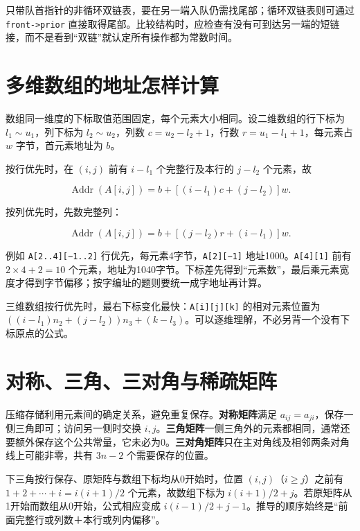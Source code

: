 只带队首指针的非循环双链表，要在另一端入队仍需找尾部；循环双链表则可通过 \texttt{front-\textgreater{}prior} 直接取得尾部。比较结构时，应检查有没有可到达另一端的短链接，而不是看到``双链''就认定所有操作都为常数时间。

\section{多维数组的地址怎样计算}\label{ds-03-05}

数组同一维度的下标取值范围固定，每个元素大小相同。设二维数组的行下标为 \(l_1\sim u_1\)，列下标为 \(l_2\sim u_2\)，列数 \(c=u_2-l_2+1\)，行数 \(r=u_1-l_1+1\)，每元素占 \(w\) 字节，首元素地址为 \(b\)。

按行优先时，在 \((i,j)\) 前有 \(i-l_1\) 个完整行及本行的 \(j-l_2\) 个元素，故

\[\operatorname{Addr}(A[i,j])=b+[(i-l_1)c+(j-l_2)]w.\]

按列优先时，先数完整列：

\[\operatorname{Addr}(A[i,j])=b+[(j-l_2)r+(i-l_1)]w.\]

例如 \texttt{A{[}2..4{]}{[}−1..2{]}} 行优先，每元素4字节，\texttt{A{[}2{]}{[}−1{]}} 地址1000。\texttt{A{[}4{]}{[}1{]}} 前有 \(2\times4+2=10\) 个元素，地址为1040字节。下标差先得到``元素数''，最后乘元素宽度才得到字节偏移；按字编址的题则要统一成字地址再计算。

三维数组按行优先时，最右下标变化最快：\texttt{A{[}i{]}{[}j{]}{[}k{]}} 的相对元素位置为 \(((i-l_1)n_2+(j-l_2))n_3+(k-l_3)\)。可以逐维理解，不必另背一个没有下标原点的公式。

\section{对称、三角、三对角与稀疏矩阵}\label{ds-03-06}

压缩存储利用元素间的确定关系，避免重复保存。\textbf{对称矩阵}满足 \(a_{ij}=a_{ji}\)，保存一侧三角即可；访问另一侧时交换 \(i,j\)。\textbf{三角矩阵}一侧三角外的元素都相同，通常还要额外保存这个公共常量，它未必为0。\textbf{三对角矩阵}只在主对角线及相邻两条对角线上可能非零，共有 \(3n-2\) 个需要保存的位置。

下三角按行保存、原矩阵与数组下标均从0开始时，位置 \((i,j)\)（\(i\ge j\)）之前有 \(1+2+\cdots+i=i(i+1)/2\) 个元素，故数组下标为 \(i(i+1)/2+j\)。若原矩阵从1开始而数组从0开始，公式相应变成 \(i(i-1)/2+j-1\)。推导的顺序始终是``前面完整行或列数＋本行或列内偏移''。


